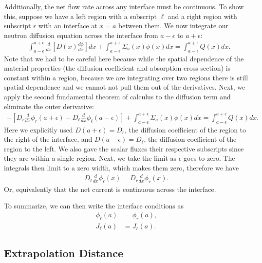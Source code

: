 Additionally, the net flow rate across any interface must be continuous. To show this, suppose we have a left region with a subscript $\ell$ and a right region with subscript $r$ with an interface at $x = a$ between them. We now integrate our neutron diffusion equation across the interface from $a - \epsilon$ to $a + \epsilon$:
\begin{align}
  -\int_{a-\epsilon}^{a+\epsilon} \frac{d}{dx} \left[ D(x) \frac{d \phi}{dx} \right] dx +  \int_{a-\epsilon}^{a+\epsilon} \Sigma_a(x) \phi(x) dx = \int_{a-\epsilon}^{a+\epsilon} Q(x) dx .
\end{align}
Note that we had to be careful here because while the spatial dependence of the material properties (the diffusion coefficient and absorption cross section) is constant within a region, because we are integrating over two regions there is still spatial dependence and we cannot not pull them out of the derivatives. Next, we apply the second fundamental theorem of calculus to the diffusion term and eliminate the outer derivative:
\begin{align}
   -\left[ D_r \frac{d}{dx} \phi_r(a+\epsilon) - D_\ell \frac{d}{dx} \phi_\ell(a-\epsilon) \right]  +  \int_{a-\epsilon}^{a+\epsilon} \Sigma_a(x) \phi(x) dx = \int_{a-\epsilon}^{a+\epsilon} Q(x) dx .
\end{align}
Here we explicitly used $D(a + \epsilon) = D_r$, the diffusion coefficient of the region to the right of the interface, and $D(a - \epsilon) = D_\ell$, the diffusion coefficient of the region to the left. We also gave the scalar fluxes their respective subscripts since they are within a single region. Next, we take the limit as $\epsilon$ goes to zero. The integrals then limit to a zero width, which makes them zero, therefore we have
\begin{align}
   D_\ell \frac{d}{dx} \phi_\ell(x) = D_r \frac{d}{dx} \phi_r(x) .
\end{align}
Or, equivalently that the net current is continuous across the interface.

To summarize, we can then write the interface conditions as
\begin{subequations}
\begin{align}
  \phi_\ell(a) &= \phi_r(a), \\
  J_\ell(a) &= J_r(a).
\end{align}
\end{subequations}

\subsection{Extrapolation Distance}

